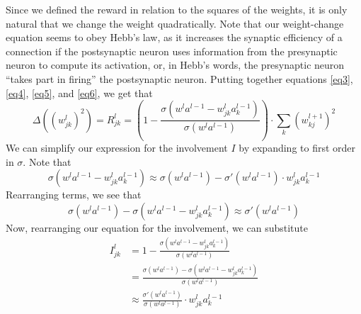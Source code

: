 \documentclass[12pt]{article}
\begin{document}
Since we defined the reward in relation to the squares of the weights, it is only natural that we change the weight quadratically. Note that our weight-change equation seems to obey Hebb's law, as it increases the synaptic efficiency of a connection if the postsynaptic neuron uses information from the presynaptic neuron to compute its activation, or, in Hebb's words, the presynaptic neuron ``takes part in firing'' \cite{Hebb1949} the postsynaptic neuron. Putting together equations \ref{eq3}, \ref{eq4}, \ref{eq5}, and \ref{eq6}, we get that
\begin{equation}
	\Delta \left(\left(w_{jk}^l\right)^2\right) = R_{jk}^l = \left(1-\frac{\sigma\left(w^l a^{l-1} - w_{jk}^l a^{l-1}_k\right)}{\sigma\left(w^l a^{l-1}\right)}\right)\cdot\sum_k \left(w_{kj}^{l+1}\right)^2\label{eq7}
\end{equation}
We can simplify our expression for the involvement $I$ by expanding to first order in $\sigma$. Note that
\begin{equation}
	\sigma\left(w^l a^{l-1} - w_{jk}^l a_k^{l-1}\right)\approx \sigma\left(w^l a^{l-1}\right) - \sigma'\left(w^l a^{l-1}\right)\cdot w_{jk}^l a_k^{l-1}
\end{equation}
Rearranging terms, we see that
\begin{equation}
	\sigma\left(w^l a^{l-1}\right) - \sigma\left(w^l a^{l-1} - w_{jk}^l a_k^{l-1}\right)\approx \sigma'\left(w^l a^{l-1}\right)
\end{equation}
Now, rearranging our equation for the involvement, we can substitute
\begin{align*}
	I_{jk}^{l} &= 1-\frac{\sigma(w^l a^{l-1} - w_{jk}^l a^{l-1}_k)}{\sigma(w^l a^{l-1})}\\ &= \frac{\sigma(w^l a^{l-1}) - \sigma(w^l a^{l-1} - w_{jk}^l a^{l-1}_k)}{\sigma(w^l a^{l-1})}\\ &\approx \frac{\sigma'\left(w^l a^{l-1}\right)}{\sigma\left(w^l a^{l-1}\right)}\cdot w_{jk}^l a_k^{l-1}
\end{align*}
\end{document}
